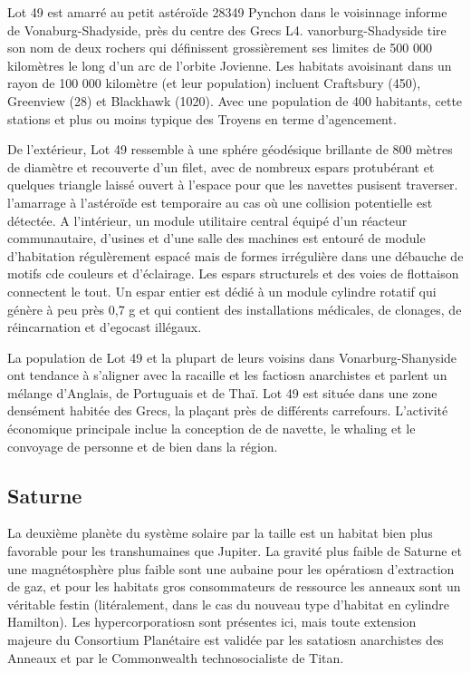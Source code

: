                                                                   Lot 49 est amarré au petit astéroïde 28349 Pynchon dans le voisinnage informe de Vonaburg-Shadyside, près du centre des Grecs L4. vanorburg-Shadyside tire son nom de deux rochers qui définissent grossièrement ses limites de 500 000 kilomètres le long d'un arc de l'orbite Jovienne. Les habitats avoisinant dans un rayon de 100 000 kilomètre (et leur population) incluent Craftsbury (450), Greenview (28) et Blackhawk (1020). Avec une population de 400 habitants, cette stations et plus ou moins typique des Troyens en terme d'agencement. 

                                                                  De l'extérieur, Lot 49 ressemble à une sphére géodésique brillante de 800 mètres de diamètre et recouverte d'un filet, avec de nombreux espars protubérant et quelques triangle laissé ouvert à l'espace pour que les navettes pusisent traverser. l'amarrage à l'astéroïde est temporaire au cas où une collision potentielle est détectée. A l'intérieur, un module utilitaire central équipé d'un réacteur communautaire, d'usines et d'une salle des machines est entouré de module d'habitation régulèrement espacé mais de formes irrégulière dans une débauche de motifs cde couleurs et d'éclairage. Les espars structurels et des voies de flottaison connectent le tout. Un espar entier est dédié à un module cylindre rotatif qui génère à peu près 0,7 g et qui contient des installations médicales, de clonages, de réincarnation et d'egocast illégaux. 

                                                                  La population de Lot 49 et la plupart de leurs voisins dans Vonarburg-Shanyside ont tendance à s'aligner avec la racaille et les factiosn anarchistes et parlent un mélange d'Anglais, de Portuguais et de Thaï. Lot 49 est située dans une zone densément habitée des Grecs, la plaçant près de différents carrefours. L'activité économique principale inclue la conception de de navette, le whaling et le convoyage de personne et de bien dans la région. 

                                                                  \subsection{Saturne} \label{sec:saturn} 

                                                                  La deuxième planète du système solaire par la taille est un habitat bien plus favorable pour les transhumaines que Jupiter. La gravité plus faible de Saturne et une magnétosphère plus faible sont une aubaine pour les opératiosn d'extraction de gaz, et pour les habitats gros consommateurs de ressource les anneaux sont un véritable festin (litéralement, dans le cas du nouveau type d'habitat en cylindre Hamilton). Les hypercorporatiosn sont présentes ici, mais toute extension majeure du Consortium Planétaire est validée par les satatiosn anarchistes des Anneaux et par le Commonwealth technosocialiste de Titan. 

